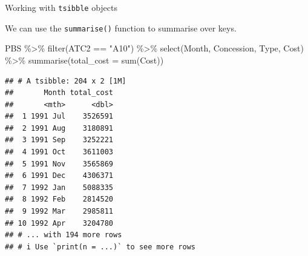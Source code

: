 \documentclass[14pt,ignorenonframetext,aspectratio=169]{beamer}
\newenvironment{Shaded}{\begin{snugshade}}{\end{snugshade}}
\newcommand{\AttributeTok}[1]{\textcolor[rgb]{0.77,0.63,0.00}{#1}}
\newcommand{\FunctionTok}[1]{\textcolor[rgb]{0.00,0.00,0.00}{#1}}
\newcommand{\NormalTok}[1]{#1}
\newcommand{\SpecialCharTok}[1]{\textcolor[rgb]{0.00,0.00,0.00}{#1}}
\newcommand{\StringTok}[1]{\textcolor[rgb]{0.31,0.60,0.02}{#1}}
\renewenvironment{Shaded}{\color{black}\begin{snugshade}\color{black}}{\end{snugshade}}
\renewenvironment{Shaded}{\color{black}\fontsize{10}{10}\sf\begin{snugshade}\color{black}}{\end{snugshade}}
\begin{document}
\begin{frame}[fragile]{Working with \texttt{tsibble} objects}
\protect\hypertarget{working-with-tsibble-objects-3}{}
\fontsize{12}{14}\sf

We can use the \texttt{summarise()} function to summarise over keys.

\fontsize{8}{10}\sf

\begin{Shaded}
\begin{Highlighting}[]
\NormalTok{PBS }\SpecialCharTok{\%\textgreater{}\%}
  \FunctionTok{filter}\NormalTok{(ATC2 }\SpecialCharTok{==} \StringTok{"A10"}\NormalTok{) }\SpecialCharTok{\%\textgreater{}\%}
  \FunctionTok{select}\NormalTok{(Month, Concession, Type, Cost) }\SpecialCharTok{\%\textgreater{}\%}
  \FunctionTok{summarise}\NormalTok{(}\AttributeTok{total\_cost =} \FunctionTok{sum}\NormalTok{(Cost))}
\end{Highlighting}
\end{Shaded}

\begin{verbatim}
## # A tsibble: 204 x 2 [1M]
##       Month total_cost
##       <mth>      <dbl>
##  1 1991 Jul    3526591
##  2 1991 Aug    3180891
##  3 1991 Sep    3252221
##  4 1991 Oct    3611003
##  5 1991 Nov    3565869
##  6 1991 Dec    4306371
##  7 1992 Jan    5088335
##  8 1992 Feb    2814520
##  9 1992 Mar    2985811
## 10 1992 Apr    3204780
## # ... with 194 more rows
## # i Use `print(n = ...)` to see more rows
\end{verbatim}
\end{frame}
\end{document}
